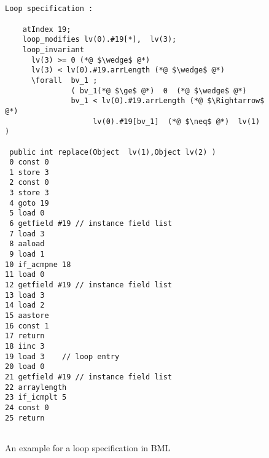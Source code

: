 \begin{figure}
\begin{lstlisting}[frame=trbl]

  
Loop specification :

    atIndex 19;
    loop_modifies lv(0).#19[*],  lv(3);
    loop_invariant
      lv(3) >= 0 (*@ $\wedge$ @*) 
      lv(3) < lv(0).#19.arrLength (*@ $\wedge$ @*)
      \forall  bv_1 ; 
               ( bv_1(*@ $\ge$ @*)  0  (*@ $\wedge$ @*) 
               bv_1 < lv(0).#19.arrLength (*@ $\Rightarrow$ @*) 
                    lv(0).#19[bv_1]  (*@ $\neq$ @*)  lv(1) )

 public int replace(Object  lv(1),Object lv(2) )
 0 const 0
 1 store 3
 2 const 0
 3 store 3
 4 goto 19
 5 load 0
 6 getfield #19 // instance field list
 7 load 3
 8 aaload
 9 load 1
10 if_acmpne 18 
11 load 0
12 getfield #19 // instance field list
13 load 3
14 load 2
15 aastore
16 const 1
17 return
18 iinc 3  
19 load 3    // loop entry 
20 load 0
21 getfield #19 // instance field list 
22 arraylength
23 if_icmplt 5
24 const 0
25 return
 
\end{lstlisting}
\caption{\sc An example for a loop specification in BML} \label{bml:loopBML}\end{figure}




